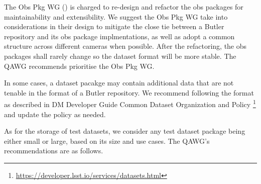 The Obs Pkg WG () is charged to re-design and refactor
the obs packages for maintainability and extensibility. We suggest
the Obs Pkg WG take into considerations in their design to mitigate
the close tie between a Butler repository and its obs package
implmentations, as well as adopt a common structure across different
cameras when possible.  After the refactoring, the obs packages
shall rarely change so the dataset format will be more stable.  The
QAWG recommends prioritise the Obs Pkg WG.

In some cases, a dataset pacakge may contain additional data that are not
tenable in the format of a Butler repository. We recommend following the
format as described in DM Developer Guide Common Dataset Organization
and Policy \footnote{\url{https://developer.lsst.io/services/datasets.html}}
and update the policy as needed.

As for the storage of test datasets, we consider any test dataset
package being either small or large, based on its size and use cases.
The QAWG's recommendations are as follows.


